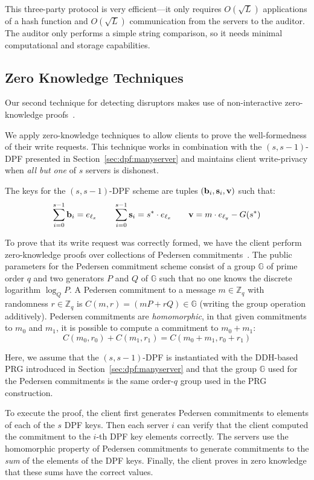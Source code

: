 \documentclass[10pt,twocolumn]{article}
\newcommand{\Z}{\mathbb{Z}}
\newcommand{\G}{\mathbb{G}}
\begin{document}
\medskip

This three-party protocol is very efficient---it only 
requires $O(\sqrt{L})$ applications of a hash function and
$O(\sqrt{L})$ communication from the servers to the auditor.
The auditor only performs a simple string comparison, so it 
needs minimal computational and storage capabilities.


\subsection{Zero Knowledge Techniques}
\label{sec:disrupt:zkp}

Our second technique for detecting disruptors makes use
of non-interactive zero-knowledge proofs~\cite{camenisch1997proof,goldwasser1989knowledge,rackoff1992non}.

We apply zero-knowledge techniques to allow clients to prove the
well-formedness of their write requests.
This technique works in combination with the 
$(s,s-1)$-DPF presented in Section~\ref{sec:dpf:manyserver}
and maintains client write-privacy 
when {\em all but one} of $s$ servers is dishonest.

The keys for the $(s,s-1)$-DPF scheme are tuples 
$({\bf b}_i, {\bf s}_i, {\bf v})$ such that:
\[ \sum_{i=0}^{s-1} {\bf b}_i = e_{\ell_x} \qquad \sum_{i=0}^{s-1} {\bf s}_i = s^* \cdot e_{\ell_x} \qquad {\bf v} = m \cdot e_{\ell_y} -G(s^*)\]

To prove that its write request was correctly formed,
we have the client perform zero-knowledge proofs over
collections of Pedersen commitments~\cite{pedersen1992non}.
The public parameters for the Pedersen commitment scheme
consist of a group $\G$ of prime order $q$ and two generators
$P$ and $Q$ of $\G$ such that no one knows the discrete logarithm
$\log_Q P$.
A Pedersen commitment to a message $m \in \Z_q$ with randomness
$r \in \Z_q$ is $C(m,r) = (m P + r Q) \in \G$
(writing the group operation additively).
Pedersen commitments are {\em homomorphic}, in that given commitments
to $m_0$ and $m_1$, it is possible to compute a commitment to $m_0+m_1$:
\[ C(m_0,r_0) + C(m_1,r_1) = C(m_0+m_1,r_0+r_1) \]

Here, we assume that the $(s,s-1)$-DPF is instantiated with the
DDH-based PRG introduced in Section~\ref{sec:dpf:manyserver} and that
the group $\G$ used for the Pedersen commitments is the same order-$q$ group 
used in the PRG construction.

To execute the proof, the client first generates
Pedersen commitments to elements of each of the $s$ DPF keys.
Then each server $i$ can verify that the client computed the commitment
to the $i$-th DPF key elements correctly.
The servers use the homomorphic property of Pedersen commitments 
to generate commitments to the \textit{sum} of the elements of the DPF keys.
Finally, the client proves in zero knowledge that these sums have the 
correct values.
\end{document}
